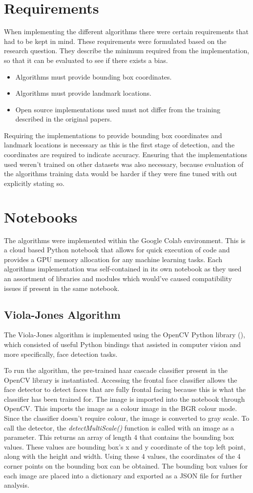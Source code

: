 \documentclass{l4proj}
\begin{document}
\section{Requirements}
When implementing the different algorithms there were certain requirements that had to be kept in mind. These requirements were formulated based on the research question. They describe the minimum required from the implementation, so that it can be evaluated to see if there exists a bias.
\begin{itemize}
  \item Algorithms must provide bounding box coordinates.
  \item Algorithms must provide landmark locations.
  \item Open source implementations used must not differ from the training described in the original papers.
\end{itemize}
Requiring the implementations to provide bounding box coordinates and landmark locations is necessary as this is the first stage of detection, and the coordinates are required to indicate accuracy. Ensuring that the implementations used weren't trained on other datasets was also necessary, because evaluation of the algorithms training data would be harder if they were fine tuned with out explicitly stating so.
\section{Notebooks}
The algorithms were implemented within the Google Colab environment. This is a cloud based Python notebook that allows for quick execution of code and provides a GPU memory allocation for any machine learning tasks. Each algorithms implementation was self-contained in its own notebook as they used an assortment of libraries and modules which would've caused compatibility issues if present in the same notebook.
\subsection{Viola-Jones Algorithm}
The Viola-Jones algorithm is implemented using the OpenCV Python library (\cite{opencv}), which consisted of useful Python bindings that assisted in computer vision and more specifically, face detection tasks.

To run the algorithm, the pre-trained haar cascade classifier present in the OpenCV library is instantiated. Accessing the frontal face classifier allows the face detector to detect faces that are fully frontal facing because this is what the classifier has been trained for. The image is imported into the notebook through OpenCV. This imports the image as a colour image in the BGR colour mode. Since the classifier doesn't require colour, the image is converted to gray scale. To call the detector, the \textit{detectMultiScale()} function is called with an image as a parameter. This returns an array of length 4 that contains the bounding box values. These values are bounding  box's x and y coordinate of the top left point, along with the height and width. Using these 4 values, the coordinates of the 4 corner points on the bounding box can be obtained. The bounding box values for each image are placed into a dictionary and exported as a JSON file for further analysis.
\end{document}
